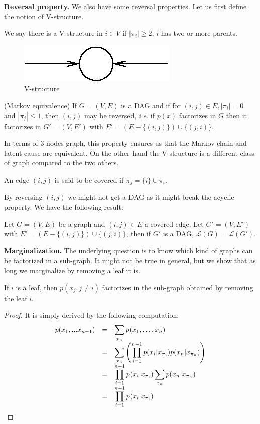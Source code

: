 \documentclass[12pt]{report}
\begin{document}
\textbf{Reversal property. }We also have some reversal properties. Let us first define the notion of V-structure.
\begin{definition}
We say there is a V-structure in $i\in V$ if $| \pi_i|\geq 2$, \ie $i$ has two or more parents.
\end{definition}
\begin{figure}[h!]
\centering
\includegraphics[scale = 1]{vstruct.eps}
\caption{V-structure}
\label{fig4}
\end{figure}
\begin{proposition}
(Markov equivalence) If $G = (V,E)$ is a DAG and if for $(i,j)\in E, | \pi_i| = 0$ and $|\pi_j| \leq 1$, then $(i,j)$ may be reversed, \emph{i.e.} if $p(x)$ factorizes in $G$ then it factorizes in $G' = (V,E')$ with $E' = (E-\{(i,j)\})\cup \{ (j,i)\}$.
\end{proposition}
In terms of 3-nodes graph, this property ensures us that the Markov chain and latent cause are equivalent. On the other hand the V-structure is a different class of graph compared to the two others.
\begin{definition}
An edge $(i,j)$ is said to be covered if $\pi_j = \{i \}\cup \pi_i$. 
\end{definition}
By reversing $(i,j)$ we might not get a DAG as it might break the acyclic property. We have the following result:
\begin{proposition}
Let $G = (V,E)$ be a graph and $(i,j)\in E$ a covered edge. Let $G'= (V,E')$ with $E' = (E-\{(i,j)\})\cup \{ (j,i)\}$, then if $G'$ is a DAG, $\mathcal{L}(G) = \mathcal{L}(G')$.
\end{proposition}

\textbf{Marginalization. }The underlying question is to know which kind of graphs can be factorized in a sub-graph. It might not be true in general, but we show that as long we marginalize by removing a leaf it is. 
\begin{proposition}
If $i$ is a leaf, then $p(x_j, j \neq i)$ factorizes in the sub-graph obtained by removing the leaf $i$.
\end{proposition}
\begin{proof}
It is simply derived by the following computation:
\begin{equation*}
\begin{array}{r l l}
   p(x_1,...x_{n-1}) & = & \displaystyle \sum_{x_n}{p(x_1,\ldots,x_n)}\\
                     & = & \displaystyle \sum_{x_n}{\left(\prod_{i=1}^{n-1}{p(x_{i}|x_{\pi_i})} p(x_n|x_{\pi_n})\right)}\\
										 & = & \displaystyle \prod_{i=1}^{n-1}{p(x_{i}|x_{\pi_i})}\sum_{x_n}{p(x_n|x_{\pi_n})}\\
                     & = & \displaystyle \prod_{i=1}^{n-1}{p(x_{i}|x_{\pi_i})}
\end{array}
\end{equation*}
\end{proof}
\end{document}
